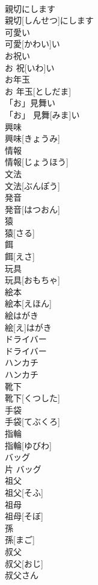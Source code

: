 \documentclass[8pt]{extreport}
\begin{document}
\begin{CJK}{UTF8}{min}
\\	親切にします	
\\	親切[しんせつ]にします	
\\	可愛い	
\\	可愛[かわい]い	
\\	お祝い	
\\	お 祝[いわ]い	
\\	お年玉	
\\	お 年玉[としだま]	
\\	「お」見舞い	
\\	「お」 見舞[みま]い	
\\	興味	
\\	興味[きょうみ]	
\\	情報	
\\	情報[じょうほう]	
\\	文法	
\\	文法[ぶんぽう]	
\\	発音	
\\	発音[はつおん]	
\\	猿	
\\	猿[さる]	
\\	餌	
\\	餌[えさ]	
\\	玩具	
\\	玩具[おもちゃ]	
\\	絵本	
\\	絵本[えほん]	
\\	絵はがき	
\\	絵[え]はがき	
\\	ドライバー	
\\	ドライバー	
\\	ハンカチ	
\\	ハンカチ	
\\	靴下	
\\	靴下[くつした]	
\\	手袋	
\\	手袋[てぶくろ]	
\\	指輪	
\\	指輪[ゆびわ]	
\\	バッグ	
\\	片	バッグ	
\\	祖父	
\\	祖父[そふ]	
\\	祖母	
\\	祖母[そぼ]	
\\	孫	
\\	孫[まご]	
\\	叔父	
\\	叔父[おじ]	
\\	叔父さん	

\end{CJK}
\end{document}
